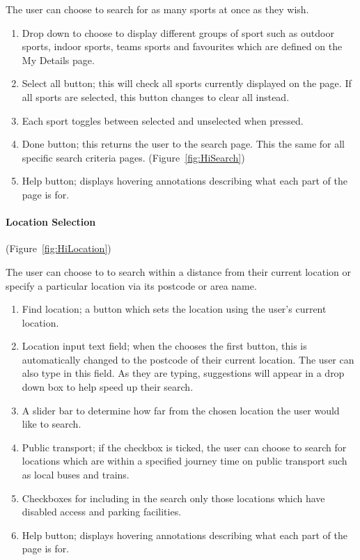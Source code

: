 The user can choose to search for as many sports at once as they wish.
\begin{enumerate}
	\item Drop down to choose to display different groups of sport such as
		outdoor sports, indoor sports, teams sports and favourites which are
		defined on the My Details page.
	\item Select all button; this will check all sports currently displayed on
		the page. If all sports are selected, this button changes to clear all
		instead.
	\item Each sport toggles between selected and unselected when pressed.
	\item Done button; this returns the user to the search page. This the same
		for all specific search criteria pages. (Figure~\ref{fig:HiSearch})
	\item Help button; displays hovering annotations describing what each part
		of the page is for.
\end{enumerate}

\paragraph{Location Selection} (Figure~\ref{fig:HiLocation})


The user can choose to to search within a distance from their current
location or specify a particular location via its postcode or area
name.
\begin{enumerate}
	\item Find location; a button which sets the location using the user's
		current location.
	\item Location input text field; when the chooses the first button, this
		is automatically changed to the postcode of their current location.
		The user can also type in this field. As they are typing, suggestions
		will appear in a drop down box to help speed up their search.
	\item A slider bar to determine how far from the chosen location the user
		would like to search.
	\item Public transport; if the checkbox is ticked, the user can choose
		to search for locations which are within a specified journey time
		on public transport such as local buses and trains.
	\item Checkboxes for including in the search only those locations which
		have disabled access and parking facilities.
	\item Help button; displays hovering annotations describing what each part
		of the page is for.
\end{enumerate}

